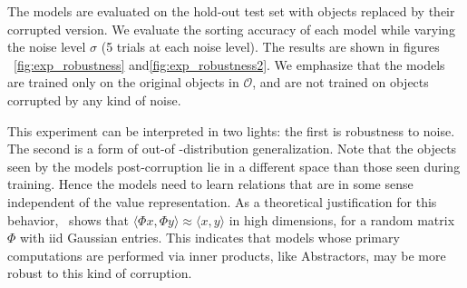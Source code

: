 The models are evaluated on the hold-out test set with objects replaced by their corrupted version. We evaluate the sorting accuracy of each model while varying the noise level $\sigma$ (5 trials at each noise level). The results are shown in figures ~\ref{fig:exp_robustness} and\ref{fig:exp_robustness2}. We emphasize that the models are trained only on the original objects in $\mathcal{O}$, and are not trained on objects corrupted by any kind of noise.

This experiment can be interpreted in two lights: the first is robustness to noise. The second is a form of out-of
-distribution generalization. Note that the objects seen by the models post-corruption lie in a different space than
those seen during training. Hence the models need to learn relations that
are in some sense independent of the value representation.
As a theoretical justification for this behavior,~\cite{zhouCompressedPrivacySensitive2009} shows that $\langle \Phi x, \Phi y \rangle \approx \langle x, y \rangle$ in high dimensions, for a random matrix $\Phi$ with iid Gaussian entries. This indicates that models whose primary computations are performed via inner products, like Abstractors, may be more robust to this kind of corruption.

